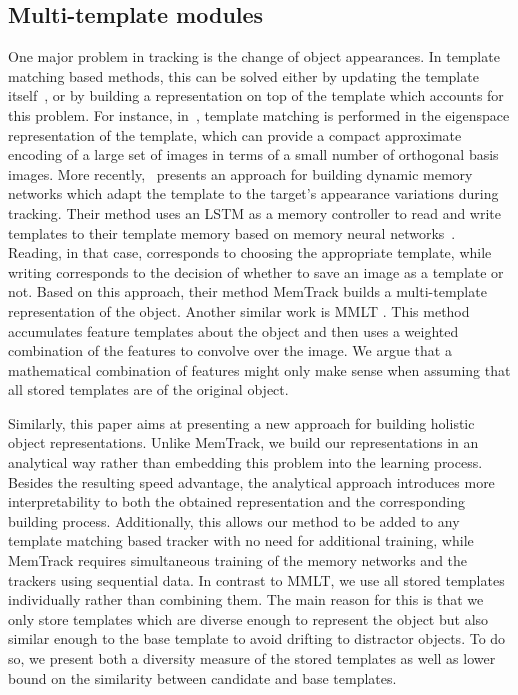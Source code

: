 \documentclass{article}
\begin{document}
\subsection{Multi-template modules}
One major problem in tracking is the change of object appearances. In template matching based methods, this can be solved either by updating the template itself~\cite{nguyen2001occlusion,held2016learning,valmadre2017end}, or by building a representation on top of the template which accounts for this problem. For instance, in~\cite{black1998eigentracking, jurie2002real}, template matching is performed in the eigenspace representation of the template,  which can provide a compact approximate encoding of a large set of images in terms of a small number of orthogonal basis images. More recently,~\cite{yang2018learning} presents an approach for building dynamic memory networks which adapt the template to the target's appearance variations during tracking. Their method uses an LSTM \cite{hochreiter1997long} as a memory controller to read and write templates to their template memory based on memory neural networks~\cite{weston2014memory, sukhbaatar2015end}. Reading, in that case, corresponds to choosing the appropriate template, while writing corresponds to the decision of whether to save an image as a template or not. Based on this approach, their method MemTrack builds a multi-template representation of the object. Another similar work is MMLT \cite{lee2018memory}. This method accumulates feature templates about the object and then uses a weighted combination of the features to convolve over the image. We argue that a mathematical combination of features might only make sense when assuming that all stored templates are of the original object.

Similarly, this paper aims at presenting a new approach for building holistic object representations. Unlike MemTrack, we build our representations in an analytical way rather than embedding this problem into the learning process. Besides the resulting speed advantage, the analytical approach introduces more interpretability to both the obtained representation and the corresponding building process. Additionally, this allows our method to be added to any template matching based tracker with no need for additional training, while MemTrack requires simultaneous training of the memory networks and the trackers using sequential data. In contrast to MMLT, we use all stored templates individually rather than combining them. The main reason for this is that we only store templates which are diverse enough to represent the object but also similar enough to the base template to avoid drifting to distractor objects. To do so, we present both a diversity measure of the stored templates as well as lower bound on the similarity between candidate and base templates.
\end{document}
